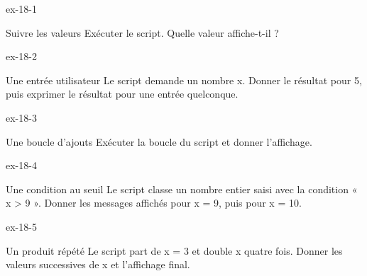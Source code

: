 \clearpage{}
\begin{blocLivre}{ex-18-1}\begin{exercice}[1]{Suivre les valeurs}
Exécuter le script. Quelle valeur affiche-t-il ?
\label{fig-ex-18-1}
\end{exercice}\end{blocLivre}
\begin{blocLivre}{ex-18-2}\begin{exercice}[1]{Une entrée utilisateur}
Le script demande un nombre x. Donner le résultat pour 5, puis exprimer le résultat pour une entrée quelconque.
\label{fig-ex-18-2}
\end{exercice}\end{blocLivre}
\begin{blocLivre}{ex-18-3}\begin{exercice}[1]{Une boucle d’ajouts}
Exécuter la boucle du script et donner l’affichage.
\label{fig-ex-18-3}
\end{exercice}\end{blocLivre}
\begin{blocLivre}{ex-18-4}\begin{exercice}[1]{Une condition au seuil}
Le script classe un nombre entier saisi avec la condition « x > 9 ». Donner les messages affichés pour x = 9, puis pour x = 10.
\label{fig-ex-18-4}
\end{exercice}\end{blocLivre}
\begin{blocLivre}{ex-18-5}\begin{exercice}[1]{Un produit répété}
Le script part de x = 3 et double x quatre fois. Donner les valeurs successives de x et l’affichage final.
\label{fig-ex-18-5}
\end{exercice}\end{blocLivre}

